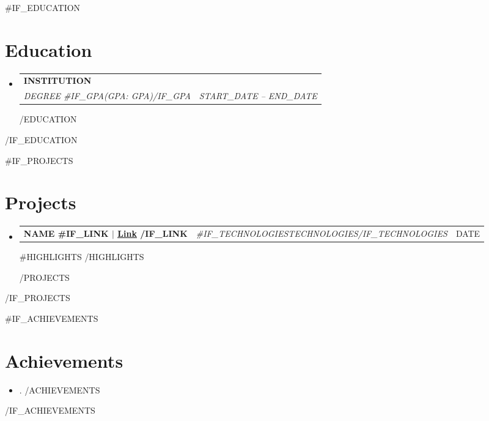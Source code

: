 \documentclass[a4paper,11pt]{article}
\makeatletter
\newcommand{\resumeItemListStart}{\begin{itemize}[rightmargin=0.11in]}
\newcommand{\resumeItemListEnd}{\end{itemize}}
\newcommand{\resumeTrioHeading}[3]{
  \item\small{
    \begin{tabular*}{0.96\textwidth}[t]{
      l@{\extracolsep{\fill}}c@{\extracolsep{\fill}}r
    }
      \textbf{#1} & \textit{#2} & #3
    \end{tabular*}
  }
}
\newcommand{\resumeQuadHeading}[4]{
  \item
  \begin{tabular*}{0.96\textwidth}[t]{l@{\extracolsep{\fill}}r}
    \textbf{#1} & #2 \\
    \textit{\small#3} & \textit{\small #4} \\
  \end{tabular*}
}
\newcommand{\resumeHeadingListStart}{
  \begin{itemize}[leftmargin=0.15in, label={}]
}
\newcommand{\resumeHeadingListEnd}{\end{itemize}}
\makeatother
\begin{document}
{{#IF_EDUCATION}}
\section{Education}
  \resumeHeadingListStart{}
    {{#EDUCATION}}
    \resumeQuadHeading{{{INSTITUTION}}}{}
    {{{DEGREE}} {{#IF_GPA}}(GPA: {{GPA}}){{/IF_GPA}}}{{{START_DATE}} -- {{END_DATE}}}
    {{/EDUCATION}}
  \resumeHeadingListEnd{}
{{/IF_EDUCATION}}

{{#IF_PROJECTS}}
\section{Projects}
  \resumeHeadingListStart{}
    {{#PROJECTS}}
    \resumeTrioHeading{{{NAME}} {{#IF_LINK}} $|$ \href{https://{{LINK}}}{\uline{Link}} {{/IF_LINK}}}{{{#IF_TECHNOLOGIES}}{{TECHNOLOGIES}}{{/IF_TECHNOLOGIES}}}{{{DATE}}}
      \resumeItemListStart{}
        {{#HIGHLIGHTS}}
        {{/HIGHLIGHTS}}
      \resumeItemListEnd{}
    {{/PROJECTS}}
  \resumeHeadingListEnd{}
{{/IF_PROJECTS}}

{{#IF_ACHIEVEMENTS}}
\section{Achievements}
  \resumeItemListStart{}
    {{#ACHIEVEMENTS}}
    \item \small{{{.}}} \vspace{-2pt}
    {{/ACHIEVEMENTS}}
  \resumeItemListEnd{}
{{/IF_ACHIEVEMENTS}}
\end{document}
